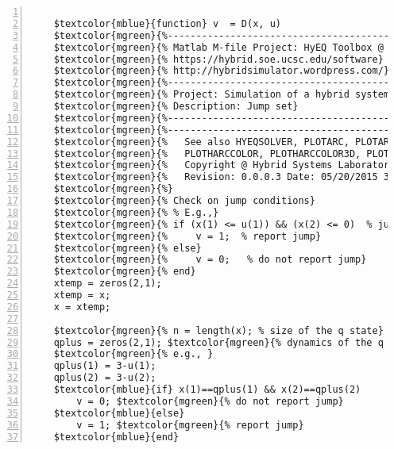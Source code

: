 %  
%  
%  
%  
  
  
\DefineShortVerb[fontfamily=courier,fontseries=m]{\$} 
\DefineShortVerb[fontfamily=courier,fontseries=b]{\#} 
  
\begin{Verbatim}[commandchars=\$\{\},numbers=left,numbersep=2pt] 

    $textcolor{mblue}{function} v  = D(x, u)  
    $textcolor{mgreen}{%--------------------------------------------------------------------------} 
    $textcolor{mgreen}{% Matlab M-file Project: HyEQ Toolbox @  Hybrid Systems Laboratory (HSL), } 
    $textcolor{mgreen}{% https://hybrid.soe.ucsc.edu/software} 
    $textcolor{mgreen}{% http://hybridsimulator.wordpress.com/} 
    $textcolor{mgreen}{%--------------------------------------------------------------------------} 
    $textcolor{mgreen}{% Project: Simulation of a hybrid system Finite state machine (FSM)} 
    $textcolor{mgreen}{% Description: Jump set} 
    $textcolor{mgreen}{%--------------------------------------------------------------------------} 
    $textcolor{mgreen}{%--------------------------------------------------------------------------} 
    $textcolor{mgreen}{%   See also HYEQSOLVER, PLOTARC, PLOTARC3, PLOTFLOWS, PLOTHARC,} 
    $textcolor{mgreen}{%   PLOTHARCCOLOR, PLOTHARCCOLOR3D, PLOTHYBRIDARC, PLOTJUMPS.} 
    $textcolor{mgreen}{%   Copyright @ Hybrid Systems Laboratory (HSL),} 
    $textcolor{mgreen}{%   Revision: 0.0.0.3 Date: 05/20/2015 3:42:00} 
    $textcolor{mgreen}{%} 
    $textcolor{mgreen}{% Check on jump conditions} 
    $textcolor{mgreen}{% % E.g.,} 
    $textcolor{mgreen}{% if (x(1) <= u(1)) && (x(2) <= 0)  % jump condition} 
    $textcolor{mgreen}{%     v = 1;  % report jump} 
    $textcolor{mgreen}{% else} 
    $textcolor{mgreen}{%     v = 0;   % do not report jump} 
    $textcolor{mgreen}{% end} 
    xtemp = zeros(2,1); 
    xtemp = x; 
    x = xtemp; 
     
    $textcolor{mgreen}{% n = length(x); % size of the q state} 
    qplus = zeros(2,1); $textcolor{mgreen}{% dynamics of the q state} 
    $textcolor{mgreen}{% e.g., } 
    qplus(1) = 3-u(1); 
    qplus(2) = 3-u(2); 
    $textcolor{mblue}{if} x(1)==qplus(1) && x(2)==qplus(2) 
        v = 0; $textcolor{mgreen}{% do not report jump} 
    $textcolor{mblue}{else} 
        v = 1; $textcolor{mgreen}{% report jump} 
    $textcolor{mblue}{end}  
\end{Verbatim}  
  
\UndefineShortVerb{\$} 
\UndefineShortVerb{\#} 
 